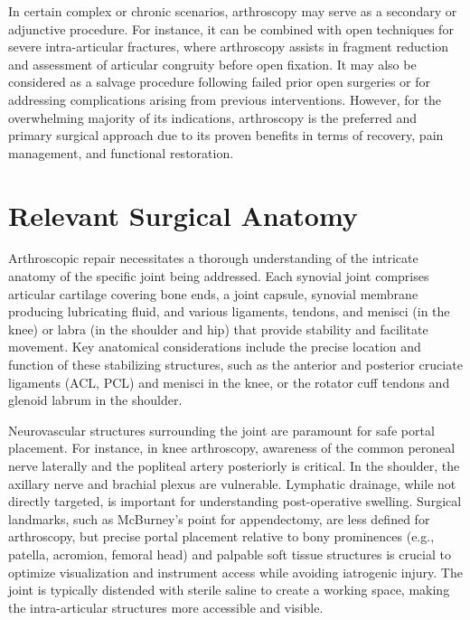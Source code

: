 In certain complex or chronic scenarios, arthroscopy may serve as a secondary or adjunctive procedure. For instance, it can be combined with open techniques for severe intra-articular fractures, where arthroscopy assists in fragment reduction and assessment of articular congruity before open fixation. It may also be considered as a salvage procedure following failed prior open surgeries or for addressing complications arising from previous interventions. However, for the overwhelming majority of its indications, arthroscopy is the preferred and primary surgical approach due to its proven benefits in terms of recovery, pain management, and functional restoration.

\section*{Relevant Surgical Anatomy}
Arthroscopic repair necessitates a thorough understanding of the intricate anatomy of the specific joint being addressed. Each synovial joint comprises articular cartilage covering bone ends, a joint capsule, synovial membrane producing lubricating fluid, and various ligaments, tendons, and menisci (in the knee) or labra (in the shoulder and hip) that provide stability and facilitate movement. Key anatomical considerations include the precise location and function of these stabilizing structures, such as the anterior and posterior cruciate ligaments (ACL, PCL) and menisci in the knee, or the rotator cuff tendons and glenoid labrum in the shoulder.

Neurovascular structures surrounding the joint are paramount for safe portal placement. For instance, in knee arthroscopy, awareness of the common peroneal nerve laterally and the popliteal artery posteriorly is critical. In the shoulder, the axillary nerve and brachial plexus are vulnerable. Lymphatic drainage, while not directly targeted, is important for understanding post-operative swelling. Surgical landmarks, such as McBurney's point for appendectomy, are less defined for arthroscopy, but precise portal placement relative to bony prominences (e.g., patella, acromion, femoral head) and palpable soft tissue structures is crucial to optimize visualization and instrument access while avoiding iatrogenic injury. The joint is typically distended with sterile saline to create a working space, making the intra-articular structures more accessible and visible.

